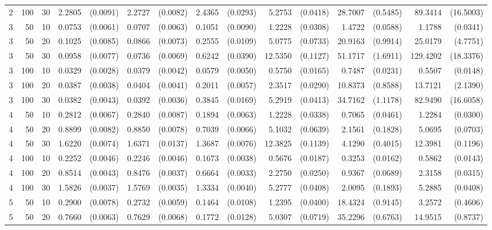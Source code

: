 \begin{table}[ht]
\begin{small}
\begin{tabular}{lrrrrrrrrrrrrrr}
  2 & 100 & 30 & 2.2805 & (0.0091) & 2.2727 & (0.0082) & 2.4365 & (0.0293) & 5.2753 & (0.0418) & 28.7007 & (0.5485) & 89.3414 & (16.5003) \\ 
  3 & 50 & 10 & 0.0753 & (0.0061) & 0.0707 & (0.0063) & 0.1051 & (0.0090) & 1.2228 & (0.0308) & 1.4722 & (0.0588) & 1.1788 & (0.0341) \\ 
  3 & 50 & 20 & 0.1025 & (0.0085) & 0.0866 & (0.0073) & 0.2555 & (0.0109) & 5.0775 & (0.0733) & 20.9163 & (0.9914) & 25.0179 & (4.7751) \\ 
  3 & 50 & 30 & 0.0958 & (0.0077) & 0.0736 & (0.0069) & 0.6242 & (0.0390) & 12.5350 & (0.1127) & 51.1717 & (1.6911) & 129.4202 & (18.3376) \\ 
  3 & 100 & 10 & 0.0329 & (0.0028) & 0.0379 & (0.0042) & 0.0579 & (0.0050) & 0.5750 & (0.0165) & 0.7487 & (0.0231) & 0.5507 & (0.0148) \\ 
  3 & 100 & 20 & 0.0387 & (0.0038) & 0.0404 & (0.0041) & 0.2011 & (0.0057) & 2.3517 & (0.0290) & 10.8373 & (0.8588) & 13.7121 & (2.1390) \\ 
  3 & 100 & 30 & 0.0382 & (0.0043) & 0.0392 & (0.0036) & 0.3845 & (0.0169) & 5.2919 & (0.0413) & 34.7162 & (1.1178) & 82.9490 & (16.6058) \\ 
  4 & 50 & 10 & 0.2812 & (0.0067) & 0.2840 & (0.0087) & 0.1894 & (0.0063) & 1.2228 & (0.0338) & 0.7065 & (0.0461) & 1.2284 & (0.0300) \\ 
  4 & 50 & 20 & 0.8899 & (0.0082) & 0.8850 & (0.0078) & 0.7039 & (0.0066) & 5.1032 & (0.0639) & 2.1561 & (0.1828) & 5.0695 & (0.0703) \\ 
  4 & 50 & 30 & 1.6220 & (0.0074) & 1.6371 & (0.0137) & 1.3687 & (0.0076) & 12.3825 & (0.1139) & 4.1290 & (0.4015) & 12.3981 & (0.1196) \\ 
  4 & 100 & 10 & 0.2252 & (0.0046) & 0.2246 & (0.0046) & 0.1673 & (0.0038) & 0.5676 & (0.0187) & 0.3253 & (0.0162) & 0.5862 & (0.0143) \\ 
  4 & 100 & 20 & 0.8514 & (0.0043) & 0.8476 & (0.0037) & 0.6664 & (0.0033) & 2.2750 & (0.0250) & 0.9367 & (0.0689) & 2.3158 & (0.0315) \\ 
  4 & 100 & 30 & 1.5826 & (0.0037) & 1.5769 & (0.0035) & 1.3334 & (0.0040) & 5.2777 & (0.0408) & 2.0095 & (0.1893) & 5.2885 & (0.0408) \\ 
  5 & 50 & 10 & 0.2900 & (0.0078) & 0.2732 & (0.0059) & 0.1464 & (0.0108) & 1.2395 & (0.0400) & 18.4324 & (0.9145) & 3.2572 & (0.4606) \\ 
  5 & 50 & 20 & 0.7660 & (0.0063) & 0.7629 & (0.0068) & 0.1772 & (0.0128) & 5.0307 & (0.0719) & 35.2296 & (0.6763) & 14.9515 & (0.8737) \\ 

\end{tabular}
\end{small}
\end{table}
